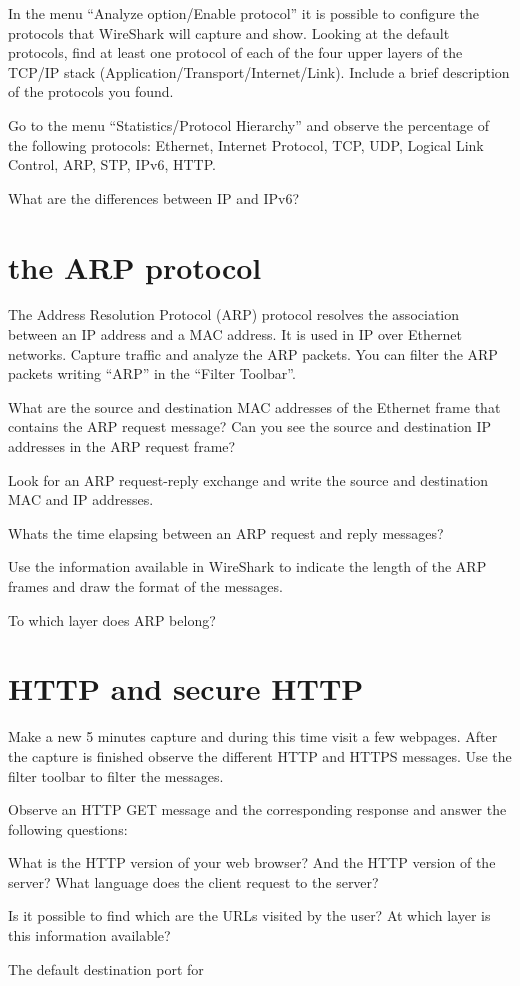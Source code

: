 In the menu ``Analyze option/Enable protocol'' it is possible to configure the protocols that WireShark will capture and show.
Looking at the default protocols, find at least one protocol of each of the four upper layers of the TCP/IP stack (Application/Transport/Internet/Link).
Include a brief description of the protocols you found.

Go to the menu ``Statistics/Protocol Hierarchy'' and observe the percentage of the following protocols: Ethernet, Internet Protocol, TCP, UDP, Logical Link Control, ARP, STP, IPv6, HTTP.

What are the differences between IP and IPv6?

\section{the ARP protocol}
The Address Resolution Protocol (ARP) protocol resolves the association between an IP address and a MAC address.
It is used in IP over Ethernet networks.
Capture traffic and analyze the ARP packets.
You can filter the ARP packets writing ``ARP'' in the ``Filter Toolbar''.

What are the source and destination MAC addresses of the Ethernet frame that contains the ARP request message?
Can you see the source and destination IP addresses in the ARP request frame?

Look for an ARP request-reply exchange and write the source and destination MAC and IP addresses.

Whats the time elapsing between an ARP request and reply messages?

Use the information available in WireShark to indicate the length of the ARP frames and draw the format of the messages.

To which layer does ARP belong?

\section{HTTP and secure HTTP}

Make a new 5 minutes capture and during this time visit a few webpages.
After the capture is finished observe the different HTTP and HTTPS messages.
Use the filter toolbar to filter the messages.

Observe an HTTP GET message and the corresponding response and answer the following questions:

What is the HTTP version of your web browser?
And the HTTP version of the server?
What language does the client request to the server?

Is it possible to find which are the URLs visited by the user?
At which layer is this information available?

The default destination port for 

